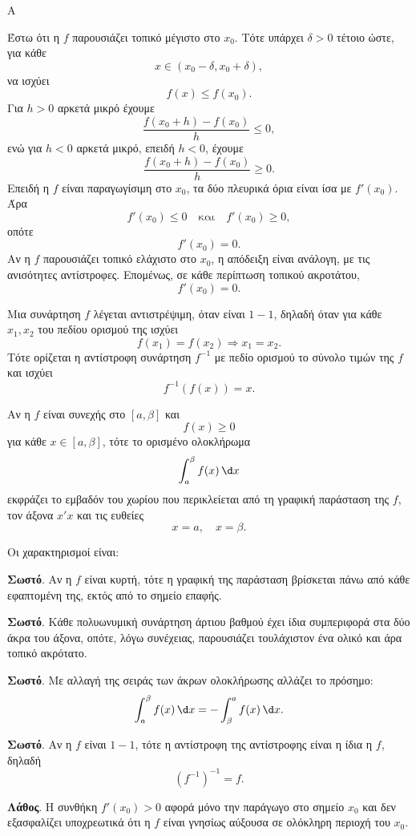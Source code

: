\begin{thema}{Α}
\begin{erwthma}
\item Έστω ότι η $f$ παρουσιάζει τοπικό μέγιστο στο $x_0$. Τότε υπάρχει $\delta>0$ τέτοιο ώστε, για κάθε
\[
x\in(x_0-\delta,x_0+\delta),
\]
να ισχύει
\[
f(x)\leq f(x_0).
\]
Για $h>0$ αρκετά μικρό έχουμε
\[
\frac{f(x_0+h)-f(x_0)}{h}\leq0,
\]
ενώ για $h<0$ αρκετά μικρό, επειδή $h<0$, έχουμε
\[
\frac{f(x_0+h)-f(x_0)}{h}\geq0.
\]
Επειδή η $f$ είναι παραγωγίσιμη στο $x_0$, τα δύο πλευρικά όρια είναι ίσα με $f'(x_0)$. Άρα
\[
f'(x_0)\leq0
\quad\text{και}\quad
f'(x_0)\geq0,
\]
οπότε
\[
f'(x_0)=0.
\]
Αν η $f$ παρουσιάζει τοπικό ελάχιστο στο $x_0$, η απόδειξη είναι ανάλογη, με τις ανισότητες αντίστροφες. Επομένως, σε κάθε περίπτωση τοπικού ακροτάτου,
\[
{f'(x_0)=0}.
\]

\item Μια συνάρτηση $f$ λέγεται αντιστρέψιμη, όταν είναι $1-1$, δηλαδή όταν για κάθε $x_1,x_2$ του πεδίου ορισμού της ισχύει
\[
f(x_1)=f(x_2)\Rightarrow x_1=x_2.
\]
Τότε ορίζεται η αντίστροφη συνάρτηση $f^{-1}$ με πεδίο ορισμού το σύνολο τιμών της $f$ και ισχύει
\[
f^{-1}(f(x))=x.
\]

\item Αν η $f$ είναι συνεχής στο $[a,\beta]$ και
\[
f(x)\geq0
\]
για κάθε $x\in[a,\beta]$, τότε το ορισμένο ολοκλήρωμα
\[
\dint_a^\beta f(x)\,\d x
\]
εκφράζει το εμβαδόν του χωρίου που περικλείεται από τη γραφική παράσταση της $f$, τον άξονα $x'x$ και τις ευθείες
\[
x=a,\quad x=\beta.
\]

\item Οι χαρακτηρισμοί είναι:
\begin{alist}
\item \textbf{Σωστό}. Αν η $f$ είναι κυρτή, τότε η γραφική της παράσταση βρίσκεται πάνω από κάθε εφαπτομένη της, εκτός από το σημείο επαφής.
\item \textbf{Σωστό}. Κάθε πολυωνυμική συνάρτηση άρτιου βαθμού έχει ίδια συμπεριφορά στα δύο άκρα του άξονα, οπότε, λόγω συνέχειας, παρουσιάζει τουλάχιστον ένα ολικό και άρα τοπικό ακρότατο.
\item \textbf{Σωστό}. Με αλλαγή της σειράς των άκρων ολοκλήρωσης αλλάζει το πρόσημο:
\[
\dint_a^\beta f(x)\,\d x
=-\dint_\beta^a f(x)\,\d x.
\]
\item \textbf{Σωστό}. Αν η $f$ είναι $1-1$, τότε η αντίστροφη της αντίστροφης είναι η ίδια η $f$, δηλαδή
\[
(f^{-1})^{-1}=f.
\]
\item \textbf{Λάθος}. Η συνθήκη $f'(x_0)>0$ αφορά μόνο την παράγωγο στο σημείο $x_0$ και δεν εξασφαλίζει υποχρεωτικά ότι η $f$ είναι γνησίως αύξουσα σε ολόκληρη περιοχή του $x_0$.
\end{alist}
\end{erwthma}
\end{thema}

